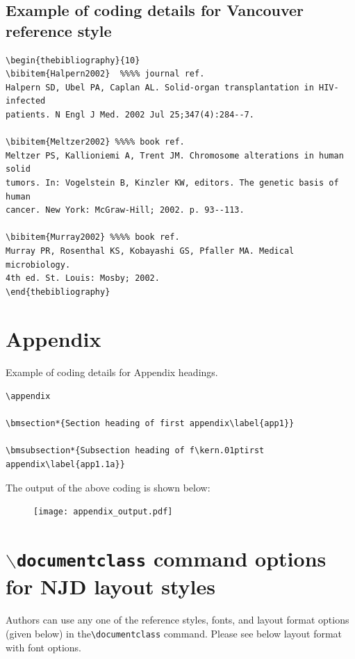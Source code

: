 \documentclass[11pt]{article}
\begin{document}
\subsection{Example of coding details for Vancouver reference style}
\begin{verbatim}
\begin{thebibliography}{10}
\bibitem{Halpern2002}  %%%% journal ref.
Halpern SD, Ubel PA, Caplan AL. Solid-organ transplantation in HIV-infected
patients. N Engl J Med. 2002 Jul 25;347(4):284--7.

\bibitem{Meltzer2002} %%%% book ref.
Meltzer PS, Kallioniemi A, Trent JM. Chromosome alterations in human solid
tumors. In: Vogelstein B, Kinzler KW, editors. The genetic basis of human
cancer. New York: McGraw-Hill; 2002. p. 93--113.

\bibitem{Murray2002} %%%% book ref.
Murray PR, Rosenthal KS, Kobayashi GS, Pfaller MA. Medical microbiology.
4th ed. St. Louis: Mosby; 2002.
\end{thebibliography}
\end{verbatim}



\section{Appendix}
\label{sec7-app}

Example of coding details for Appendix headings.

\begin{verbatim}
\appendix

\bmsection*{Section heading of first appendix\label{app1}}

\bmsubsection*{Subsection heading of f\kern.01ptirst appendix\label{app1.1a}}
\end{verbatim}

\noindent The output of the above coding is shown below:
\begin{figure}[!h]
\noindent\hspace*{-5pt}\texttt{[image: appendix\_output.pdf]}
\vspace*{-22pt}
\end{figure}

\section*{{\tt $\backslash$documentclass} command options for NJD layout styles}

Authors can use any one of the reference styles, fonts, and layout format options (given below) in the\break \verb|\documentclass| command. Please see below layout format with font options.\vskip12pt
\end{document}

